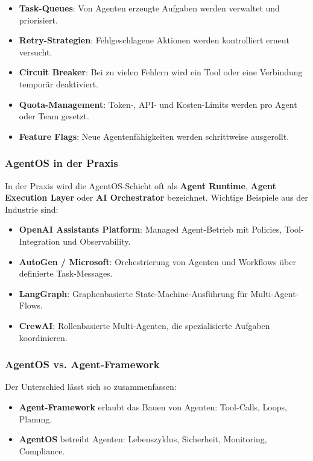\begin{itemize}[leftmargin=*]
    \item \textbf{Task-Queues}: Von Agenten erzeugte Aufgaben werden verwaltet und priorisiert.
    \item \textbf{Retry-Strategien}: Fehlgeschlagene Aktionen werden kontrolliert erneut versucht.
    \item \textbf{Circuit Breaker}: Bei zu vielen Fehlern wird ein Tool oder eine Verbindung temporär deaktiviert.
    \item \textbf{Quota-Management}: Token-, API- und Kosten-Limits werden pro Agent oder Team gesetzt.
    \item \textbf{Feature Flags}: Neue Agentenfähigkeiten werden schrittweise ausgerollt.
\end{itemize}

\subsubsection{AgentOS in der Praxis}

In der Praxis wird die AgentOS-Schicht oft als \textbf{Agent Runtime}, \textbf{Agent Execution Layer} oder \textbf{AI Orchestrator} bezeichnet. Wichtige Beispiele aus der Industrie sind:

\begin{itemize}[leftmargin=*]
    \item \textbf{OpenAI Assistants Platform}: Managed Agent-Betrieb mit Policies, Tool-Integration und Observability.
    \item \textbf{AutoGen / Microsoft}: Orchestrierung von Agenten und Workflows über definierte Task-Messages.
    \item \textbf{LangGraph}: Graphenbasierte State-Machine-Ausführung für Multi-Agent-Flows.
    \item \textbf{CrewAI}: Rollenbasierte Multi-Agenten, die spezialisierte Aufgaben koordinieren.
\end{itemize}

\subsubsection{AgentOS vs. Agent-Framework}

Der Unterschied lässt sich so zusammenfassen:

\begin{itemize}

    \item \textbf{Agent-Framework} erlaubt das Bauen von Agenten: Tool-Calls, Loops, Planung.
    \item \textbf{AgentOS} betreibt Agenten: Lebenszyklus, Sicherheit, Monitoring, Compliance.
\end{itemize}

